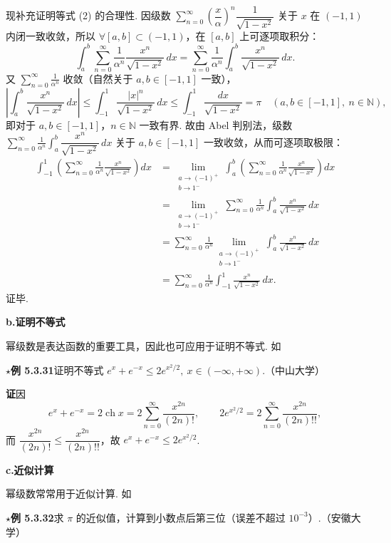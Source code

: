 \documentclass[UTF8, 12pt, fontset=fandol, oneside]{ctexart}
\begin{document}
现补充证明等式 (2) 的合理性. 因级数
$\displaystyle\sum_{n=0}^{\infty}\left(\dfrac{x}{\alpha}\right)^n\dfrac1{\sqrt{1-x^2}}$
关于 $x$ 在 $(-1,1)$ 内闭一致收敛，所以 $\forall[a,b]\subset(-1,1)$，在 $[a,b]$ 上可逐项取积分：
\[
  \int_a^b\sum_{n=0}^{\infty}\frac1{\alpha^n}\frac{x^n}{\sqrt{1-x^2}}\,dx
  =\sum_{n=0}^{\infty}\frac1{\alpha^n}\int_a^b\frac{x^n}{\sqrt{1-x^2}}\,dx.
\]
又 $\displaystyle\sum_{n=0}^{\infty}\frac1{\alpha^n}$ 收敛（自然关于 $a,b\in[-1,1]$ 一致），
\[
  \left|\int_a^b\frac{x^n}{\sqrt{1-x^2}}\,dx\right|
  \le\int_{-1}^1\frac{|x|^n}{\sqrt{1-x^2}}\,dx
  \le\int_{-1}^1\frac{dx}{\sqrt{1-x^2}}=\pi
  \quad(a,b\in[-1,1],\ n\in\mathbb N),
\]
即对于 $a,b\in[-1,1]$，$n\in\mathbb N$ 一致有界. 故由 Abel 判别法，级数
$\displaystyle\sum_{n=0}^{\infty}\frac1{\alpha^n}\int_a^b\dfrac{x^n}{\sqrt{1-x^2}}\,dx$
关于 $a,b\in[-1,1]$ 一致收敛，从而可逐项取极限：
\[
\begin{aligned}
\int_{-1}^1\left(\sum_{n=0}^{\infty}\frac1{\alpha^n}\frac{x^n}{\sqrt{1-x^2}}\right)dx
&=\lim_{\substack{a\to(-1)^+\\ b\to1^-}}\int_a^b\left(\sum_{n=0}^{\infty}\frac1{\alpha^n}\frac{x^n}{\sqrt{1-x^2}}\right)dx\\
&=\lim_{\substack{a\to(-1)^+\\ b\to1^-}}\sum_{n=0}^{\infty}\frac1{\alpha^n}\int_a^b\frac{x^n}{\sqrt{1-x^2}}\,dx\\
&=\sum_{n=0}^{\infty}\frac1{\alpha^n}\lim_{\substack{a\to(-1)^+\\ b\to1^-}}\int_a^b\frac{x^n}{\sqrt{1-x^2}}\,dx\\
&=\sum_{n=0}^{\infty}\frac1{\alpha^n}\int_{-1}^1\frac{x^n}{\sqrt{1-x^2}}\,dx.
\end{aligned}
\]
证毕.

\noindent\textbf{b.\quad 证明不等式}

幂级数是表达函数的重要工具，因此也可应用于证明不等式. 如

\noindent\(\star\)\textbf{例 5.3.31}\quad 证明不等式
$e^x+e^{-x}\le2e^{x^2/2},\ x\in(-\infty,+\infty)$.（中山大学）

\noindent\textbf{证}\quad 因
\[
  e^x+e^{-x}=2\operatorname{ch}x=2\sum_{n=0}^{\infty}\frac{x^{2n}}{(2n)!},\qquad
  2e^{x^2/2}=2\sum_{n=0}^{\infty}\frac{x^{2n}}{(2n)!!},
\]
而 $\dfrac{x^{2n}}{(2n)!}\le\dfrac{x^{2n}}{(2n)!!}$，故
$e^x+e^{-x}\le2e^{x^2/2}$.

\noindent\textbf{c.\quad 近似计算}

幂级数常常用于近似计算. 如

\noindent\(\star\)\textbf{例 5.3.32}\quad 求 $\pi$ 的近似值，计算到小数点后第三位（误差不超过 $10^{-3}$）.（安徽大学）
\end{document}
